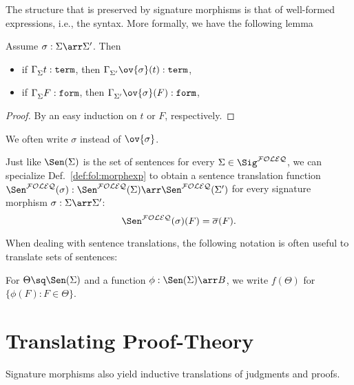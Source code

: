 The structure that is preserved by signature morphisms is that of well-formed expressions, i.e., the syntax. More formally, we have the following lemma
\begin{lemma}\label{lem:fol:morphexp}
Assume $\sigma:\Sigma\arr\Sigma'$. Then
\begin{itemize}
 \item if $\Gamma^{}_{\Sigma}t:\mathtt{term}$, then $\isterm{\Sigma'}{\Gamma}{\ov{\sigma}(t)}$,
 \item if $\Gamma^{}_{\Sigma}F:\mathtt{form}$, then $\isform{\Sigma'}{\Gamma}{\ov{\sigma}(F)}$,
\end{itemize}
\end{lemma}
\begin{proof}
By an easy induction on $t$ or $F$, respectively.
\end{proof}

\begin{notation}
We often write $\sigma$ instead of $\ov{\sigma}$.
\end{notation}

\begin{definition}\label{def:fol:morphsen}
Just like $\Sen(\Sigma)$ is the set of sentences for every $\Sigma\in\Sig^{\FOLEQ}$, we can specialize Def.~\ref{def:fol:morphexp} to obtain a sentence translation function $\Sen^{\FOLEQ}(\sigma):\Sen^{\FOLEQ}(\Sigma)\arr\Sen^{\FOLEQ}(\Sigma')$ for every signature morphism $\sigma:\Sigma\arr\Sigma'$: \[\Sen^{\FOLEQ}(\sigma)(F)=\overline{\sigma}(F).\]
\end{definition}
\medskip

When dealing with sentence translations, the following notation is often useful to translate sets of sentences:
\begin{notation}\label{not:mapsets}
For $\Theta\sq\Sen(\Sigma)$ and a function $\phi:\Sen(\Sigma)\arr B$, we write $f(\Theta)$ for $\{\phi(F) : F\in\Theta\}$.
\end{notation}

\section{Translating Proof-Theory}

Signature morphisms also yield inductive translations of judgments and proofs. 

